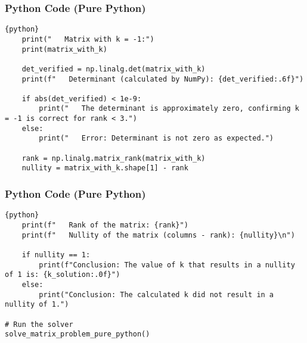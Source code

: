 \documentclass{beamer}
\begin{document}
\begin{frame}[fragile]
\frametitle{Python Code (Pure Python)}
\begin{lstlisting}{python}
    print("   Matrix with k = -1:")
    print(matrix_with_k)

    det_verified = np.linalg.det(matrix_with_k)
    print(f"   Determinant (calculated by NumPy): {det_verified:.6f}")

    if abs(det_verified) < 1e-9:
        print("   The determinant is approximately zero, confirming k = -1 is correct for rank < 3.")
    else:
        print("   Error: Determinant is not zero as expected.")

    rank = np.linalg.matrix_rank(matrix_with_k)
    nullity = matrix_with_k.shape[1] - rank
\end{lstlisting}
\end{frame}

\begin{frame}[fragile]
\frametitle{Python Code (Pure Python)}
\begin{lstlisting}{python}
    print(f"   Rank of the matrix: {rank}")
    print(f"   Nullity of the matrix (columns - rank): {nullity}\n")

    if nullity == 1:
        print(f"Conclusion: The value of k that results in a nullity of 1 is: {k_solution:.0f}")
    else:
        print("Conclusion: The calculated k did not result in a nullity of 1.")

# Run the solver
solve_matrix_problem_pure_python()
\end{lstlisting}
\end{frame}
\end{document}
